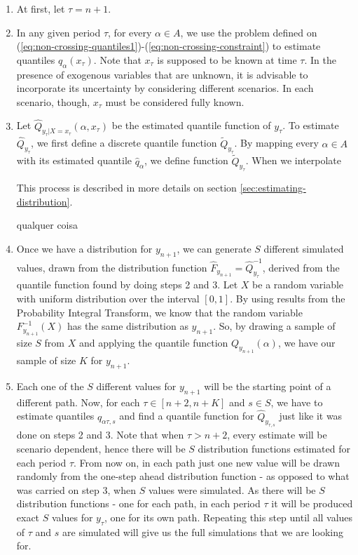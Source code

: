 \begin{enumerate}
	
\item At first, let $\tau = n + 1$.

\item In any given period $\tau$, for every $\alpha \in A$, we use the problem defined on  (\ref{eq:non-crossing-quantiles1})-(\ref{eq:non-crossing-constraint}) to estimate quantiles 
 $q_\alpha(x_{\tau})$.
Note that $x_{\tau}$ is supposed to be known at time $\tau$. In the presence of exogenous variables that are unknown, it is advisable to incorporate its uncertainty by considering different scenarios. In each scenario, though, $x_{\tau}$ must be considered fully known. 
 
\item Let $\hat{Q}_{y_{\tau}|X=x_\tau}(\alpha,x_\tau)$ be the estimated quantile function of ${y}_{\tau}$. 
To estimate $\hat{Q}_{y_{\tau}}$, we first define a discrete quantile function $\tilde{Q}_{y_\tau}$. By mapping every $\alpha \in A$ with its estimated quantile $\hat{q}_{\alpha}$, we define function $\tilde{Q}_{y_{\tau}}$. When we interpolate 

This process is described in more details on section \ref{sec:estimating-distribution}. 

qualquer coisa

\item Once we have a distribution for $y_{n+1}$, we can generate $S$ different simulated values, drawn from the distribution function $\hat{F}_{y_{n+1}} = \hat{Q}^{-1}_{y_{\tau}}$, derived from the quantile function found by doing steps 2 and 3. 
Let $X$ be a random variable with uniform distribution over the interval $[0,1]$. By using results from the Probability Integral Transform, we know that the random variable $F^{-1}_{y_{n+1}}(X)$ has the same distribution as $y_{n+1}$. So, by drawing a sample of size $S$ from $X$ and applying the quantile function $Q_{y_{n+1}}(\alpha)$, we have our sample of size $K$ for $y_{n+1}$.

\item Each one of the $S$ different values for $y_{n+1}$ will be the starting point of a different path. Now, for each $\tau \in [n+2,n+K]$ and $s \in S$, we have to estimate quantiles $q_{\alpha \tau, s}$ and find a quantile function for $\hat{Q}_{y_{\tau,s}}$ just like it was done on steps 2 and 3.
Note that when $\tau > n+2$, every estimate will be scenario dependent, hence there will be $S$ distribution functions estimated for each period $\tau$. From now on, in each path just one new value will be drawn randomly from the one-step ahead distribution function - as opposed to what was carried on step 3, when $S$ values were simulated. As there will be $S$ distribution functions - one for each path, in each period $\tau$ it will be produced exact $S$ values for $y_\tau$, one for its own path. Repeating this step until all values of $\tau$ and $s$ are simulated will give us the full simulations that we are looking for.
\end{enumerate}

